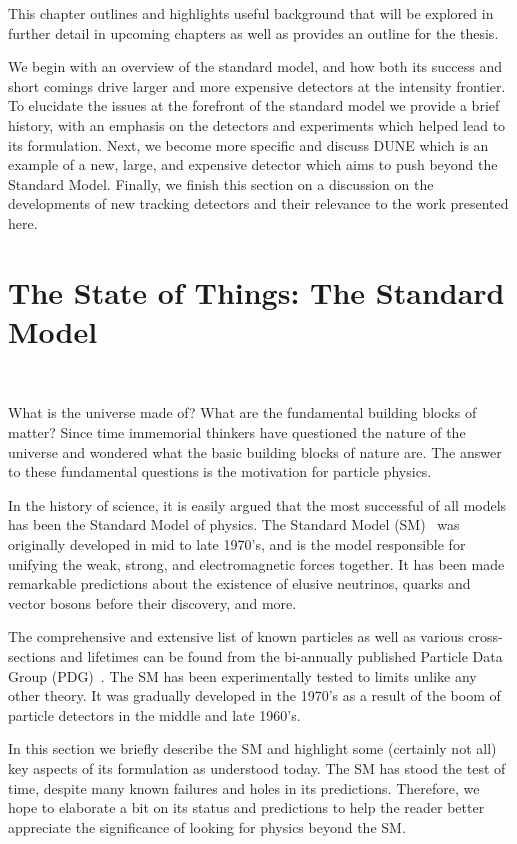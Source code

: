 This chapter outlines and highlights useful background that will be explored in further detail in upcoming chapters as well as provides an outline for the thesis.

We begin with an overview of the standard model, and how both its success and short comings drive larger and more expensive detectors at the intensity frontier.
To elucidate the issues at the forefront of the standard model we provide a brief history, with an emphasis on the detectors and experiments which helped lead to its formulation.
Next, we become more specific and discuss DUNE which is an example of a new, large, and expensive detector which aims to push beyond the Standard Model.
Finally, we finish this section on a discussion on the developments of new tracking detectors and their relevance to the work presented here.

\section{The State of Things: The Standard Model}
~\label{sec:intro_now}

What is the universe made of?
What are the fundamental building blocks of matter?
Since time immemorial thinkers have questioned the nature of the universe and wondered what the basic building blocks of nature are.
The answer to these fundamental questions is the motivation for particle physics.

In the history of science, it is easily argued that the most successful of all models has been the Standard Model of physics.
The Standard Model (SM)~\citep{GLASHOW1961579, salam1964electromagnetic, weinberg1967model} was originally developed in mid to late 1970's, and is the model responsible for unifying the weak, strong, and electromagnetic forces together.
It has been made remarkable predictions about the existence of elusive neutrinos, quarks and vector bosons before their discovery, and more.

The comprehensive and extensive list of known particles as well as various cross-sections and lifetimes can be found from the bi-annually published Particle Data Group (PDG)~\citep{Workman:2022ynf}.
The SM has been experimentally tested to limits unlike any other theory.
It was gradually developed in the 1970's as a result of the boom of particle detectors in the middle and late 1960's.

In this section we briefly describe the SM and highlight some (certainly not all) key aspects of its formulation as understood today.
The SM has stood the test of time, despite many known failures and holes in its predictions.
Therefore, we hope to elaborate a bit on its status and predictions to help the reader better appreciate the significance of looking for physics beyond the SM.

